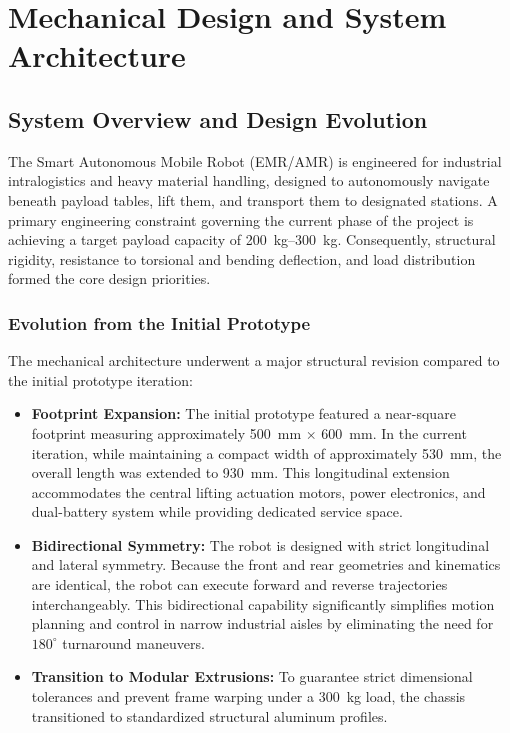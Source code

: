 \documentclass[12pt, a4paper]{report}
\begin{document}
\chapter{Mechanical Design and System Architecture}

\section{System Overview and Design Evolution}
The Smart Autonomous Mobile Robot (EMR/AMR) is engineered for industrial intralogistics and heavy material handling, designed to autonomously navigate beneath payload tables, lift them, and transport them to designated stations. A primary engineering constraint governing the current phase of the project is achieving a target payload capacity of \SIrange{200}{300}{\kilogram}. Consequently, structural rigidity, resistance to torsional and bending deflection, and load distribution formed the core design priorities.

\subsection{Evolution from the Initial Prototype}
The mechanical architecture underwent a major structural revision compared to the initial prototype iteration:
\begin{itemize}
    \item \textbf{Footprint Expansion:} The initial prototype featured a near-square footprint measuring approximately \SI{500}{\milli\meter} $\times$ \SI{600}{\milli\meter}. In the current iteration, while maintaining a compact width of approximately \SI{530}{\milli\meter}, the overall length was extended to \SI{930}{\milli\meter}. This longitudinal extension accommodates the central lifting actuation motors, power electronics, and dual-battery system while providing dedicated service space.
    \item \textbf{Bidirectional Symmetry:} The robot is designed with strict longitudinal and lateral symmetry. Because the front and rear geometries and kinematics are identical, the robot can execute forward and reverse trajectories interchangeably. This bidirectional capability significantly simplifies motion planning and control in narrow industrial aisles by eliminating the need for $180^\circ$ turnaround maneuvers.
    \item \textbf{Transition to Modular Extrusions:} To guarantee strict dimensional tolerances and prevent frame warping under a \SI{300}{\kilogram} load, the chassis transitioned to standardized structural aluminum profiles.
\end{itemize}
\end{document}
